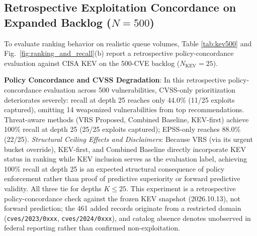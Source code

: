 \documentclass[conference]{IEEEtran}
\begin{document}
\subsection{\texorpdfstring{Retrospective Exploitation Concordance on Expanded Backlog ($N=500$)}{Retrospective Exploitation Concordance on Expanded Backlog (N=500)}}
To evaluate ranking behavior on realistic queue volumes, Table \ref{tab:kev500} and Fig.~\ref{fig:ranking_and_recall}(b) report a retrospective policy-concordance evaluation against CISA KEV on the 500-CVE backlog ($N_{\text{KEV}}=25$).

\begin{table}[t]
\centering
\caption{Retrospective CISA KEV Policy Concordance on 500-CVE Backlog ($N=500, N_{\text{KEV}}=25$)}
\label{tab:kev500}
\end{table}

\textbf{Policy Concordance and CVSS Degradation}: In this retrospective policy-concordance evaluation across 500 vulnerabilities, CVSS-only prioritization deteriorates severely: recall at depth 25 reaches only 44.0\% (11/25 exploits captured), omitting 14 weaponized vulnerabilities from top recommendations. Threat-aware methods (VRS Proposed, Combined Baseline, KEV-first) achieve 100\% recall at depth 25 (25/25 exploits captured); EPSS-only reaches 88.0\% (22/25).
\textit{Structural Ceiling Effects and Disclaimers}: Because VRS (via its urgent bucket override), KEV-first, and Combined Baseline directly incorporate KEV status in ranking while KEV inclusion serves as the evaluation label, achieving 100\% recall at depth 25 is an expected structural consequence of policy enforcement rather than proof of predictive superiority or forward predictive validity. All three tie for depths $K \le 25$. This experiment is a retrospective policy-concordance check against the frozen KEV snapshot (2026.10.13), not forward prediction; the 461 added records originate from a restricted domain (\texttt{cves/2023/0xxx}, \texttt{cves/2024/0xxx}), and catalog absence denotes unobserved in federal reporting rather than confirmed non-exploitation.
\end{document}
